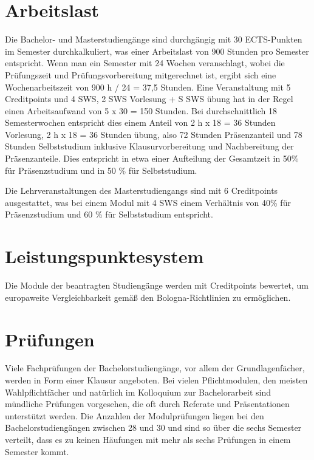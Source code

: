 \section{Arbeitslast}\label{arbeitslast}

Die Bachelor- und Masterstudiengänge sind durchgängig mit 30
ECTS-Punkten im Semester durchkalkuliert, was einer Arbeitslast von 900
Stunden pro Semester entspricht. Wenn man ein Semester mit 24 Wochen
veranschlagt, wobei die Prüfungszeit und Prüfungsvorbereitung
mitgerechnet ist, ergibt sich eine Wochenarbeitszeit von 900 h / 24 =
37,5 Stunden. Eine Veranstaltung mit 5 Creditpoints und 4 SWS, 2 SWS
Vorlesung + S SWS übung hat in der Regel einen Arbeitsaufwand von 5 x 30
= 150 Stunden. Bei durchschnittlich 18 Semesterwochen entspricht dies
einem Anteil von 2 h x 18 = 36 Stunden Vorlesung, 2 h x 18 = 36 Stunden
übung, also 72 Stunden Präsenzanteil und 78 Stunden Selbststudium
inklusive Klausurvorbereitung und Nachbereitung der Präsenzanteile. Dies
entspricht in etwa einer Aufteilung der Gesamtzeit in 50\% für
Präsenzstudium und in 50 \% für Selbststudium.

Die Lehrveranstaltungen des Masterstudiengangs sind mit 6 Creditpoints
ausgestattet, was bei einem Modul mit 4 SWS einem Verhältnis von 40\%
für Präsenzstudium und 60 \% für Selbststudium entspricht.

\section{Leistungspunktesystem}\label{leistungspunktesystem}

Die Module der beantragten Studiengänge werden mit Creditpoints
bewertet, um europaweite Vergleichbarkeit gemäß den Bologna-Richtlinien
zu ermöglichen.

\section{Prüfungen}\label{pruxfcfungen}

Viele Fachprüfungen der Bachelorstudiengänge, vor allem der
Grundlagenfächer, werden in Form einer Klausur angeboten. Bei vielen
Pflichtmodulen, den meisten Wahlpflichtfächer und natürlich im
Kolloquium zur Bachelorarbeit sind mündliche Prüfungen vorgesehen, die
oft durch Referate und Präsentationen unterstützt werden. Die Anzahlen
der Modulprüfungen liegen bei den Bachelorstudiengängen zwischen 28 und
30 und sind so über die sechs Semester verteilt, dass es zu keinen
Häufungen mit mehr als sechs Prüfungen in einem Semester kommt.


